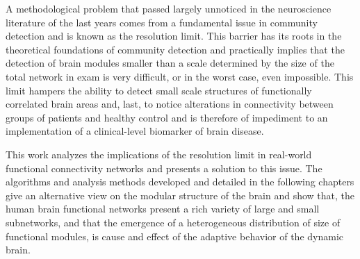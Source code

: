 A methodological problem that passed largely unnoticed in the neuroscience literature of the last years comes from a fundamental issue in community detection and is known as the resolution limit. This barrier has its roots in the theoretical foundations of community detection and practically implies that the detection of brain modules smaller than a scale determined by the size of the total network in exam is very difficult, or in the worst case, even impossible. This limit hampers the ability to detect small scale structures of functionally correlated brain areas and, last, to notice alterations in connectivity between groups of patients and healthy control and is therefore of impediment to an implementation of a clinical-level biomarker of brain disease.

This work analyzes the implications of the resolution limit in real-world functional connectivity networks and presents a solution to this issue.
The algorithms and analysis methods developed and detailed in the following chapters give an alternative view on the modular structure of the brain and show that, the human brain functional networks present a rich variety of large and small subnetworks, and that the emergence of a heterogeneous distribution of size of functional modules, is cause and effect of the adaptive behavior of the dynamic brain.

